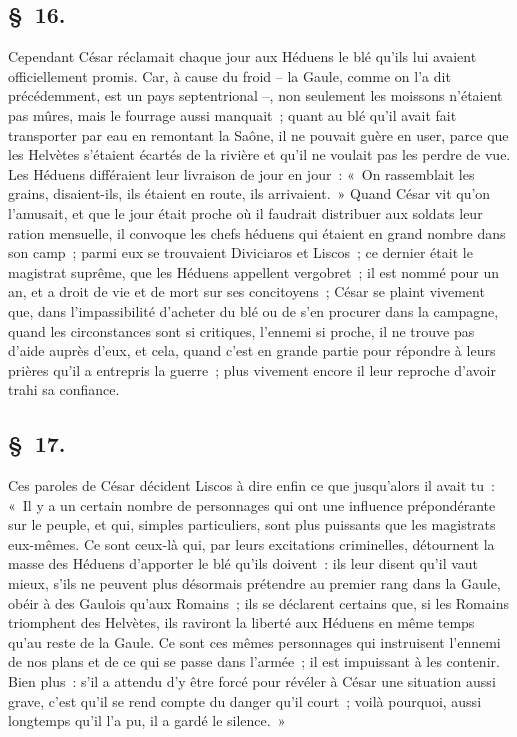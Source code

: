 \documentclass[french,twoside]{book} %
\begin{document}
\subsection[{§ 16.}]{ \textsc{§ 16.} }
\noindent Cependant César réclamait chaque jour aux Héduens le blé qu’ils lui avaient officiellement promis. Car, à cause du froid – la Gaule, comme on l’a dit précédemment, est un pays septentrional –, non seulement les moissons n’étaient pas mûres, mais le fourrage aussi manquait ; quant au blé qu’il avait fait transporter par eau en remontant la Saône, il ne pouvait guère en user, parce que les Helvètes s’étaient écartés de la rivière et qu’il ne voulait pas les perdre de vue. Les Héduens différaient leur livraison de jour en jour : « On rassemblait les grains, disaient-ils, ils étaient en route, ils arrivaient. » Quand César vit qu’on l’amusait, et que le jour était proche où il faudrait distribuer aux soldats leur ration mensuelle, il convoque les chefs héduens qui étaient en grand nombre dans son camp ; parmi eux se trouvaient Diviciaros et Liscos ; ce dernier était le magistrat suprême, que les Héduens appellent vergobret ; il est nommé pour un an, et a droit de vie et de mort sur ses concitoyens ; César se plaint vivement que, dans l’impassibilité d’acheter du blé ou de s’en procurer dans la campagne, quand les circonstances sont si critiques, l’ennemi si proche, il ne trouve pas d’aide auprès d’eux, et cela, quand c’est en grande partie pour répondre à leurs prières qu’il a entrepris la guerre ; plus vivement encore il leur reproche d’avoir trahi sa confiance.
\subsection[{§ 17.}]{ \textsc{§ 17.} }
\noindent Ces paroles de César décident Liscos à dire enfin ce que jusqu’alors il avait tu : « Il y a un certain nombre de personnages qui ont une influence prépondérante sur le peuple, et qui, simples particuliers, sont plus puissants que les magistrats eux-mêmes. Ce sont ceux-là qui, par leurs excitations criminelles, détournent la masse des Héduens d’apporter le blé qu’ils doivent : ils leur disent qu’il vaut mieux, s’ils ne peuvent plus désormais prétendre au premier rang dans la Gaule, obéir à des Gaulois qu’aux Romains ; ils se déclarent certains que, si les Romains triomphent des Helvètes, ils raviront la liberté aux Héduens en même temps qu’au reste de la Gaule. Ce sont ces mêmes personnages qui instruisent l’ennemi de nos plans et de ce qui se passe dans l’armée ; il est impuissant à les contenir. Bien plus : s’il a attendu d’y être forcé pour révéler à César une situation aussi grave, c’est qu’il se rend compte du danger qu’il court ; voilà pourquoi, aussi longtemps qu’il l’a pu, il a gardé le silence. »
\end{document}
